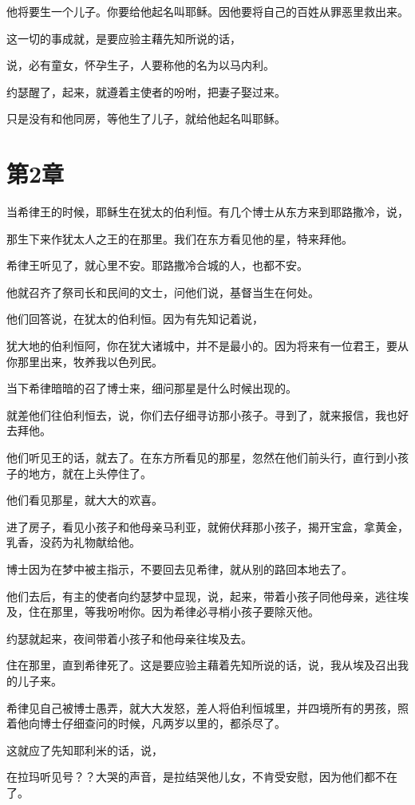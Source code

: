 \documentclass[12pt,oneside]{book}
\begin{document}
他将要生一个儿子。你要给他起名叫耶稣。因他要将自己的百姓从罪恶里救出来。

这一切的事成就，是要应验主藉先知所说的话，

说，必有童女，怀孕生子，人要称他的名为以马内利。

约瑟醒了，起来，就遵着主使者的吩咐，把妻子娶过来。

只是没有和他同房，等他生了儿子，就给他起名叫耶稣。

\chapter{第2章}
当希律王的时候，耶稣生在犹太的伯利恒。有几个博士从东方来到耶路撒冷，说，

那生下来作犹太人之王的在那里。我们在东方看见他的星，特来拜他。

希律王听见了，就心里不安。耶路撒冷合城的人，也都不安。

他就召齐了祭司长和民间的文士，问他们说，基督当生在何处。

他们回答说，在犹太的伯利恒。因为有先知记着说，

犹大地的伯利恒阿，你在犹大诸城中，并不是最小的。因为将来有一位君王，要从你那里出来，牧养我以色列民。

当下希律暗暗的召了博士来，细问那星是什么时候出现的。

就差他们往伯利恒去，说，你们去仔细寻访那小孩子。寻到了，就来报信，我也好去拜他。

他们听见王的话，就去了。在东方所看见的那星，忽然在他们前头行，直行到小孩子的地方，就在上头停住了。

他们看见那星，就大大的欢喜。

进了房子，看见小孩子和他母亲马利亚，就俯伏拜那小孩子，揭开宝盒，拿黄金，乳香，没药为礼物献给他。

博士因为在梦中被主指示，不要回去见希律，就从别的路回本地去了。

他们去后，有主的使者向约瑟梦中显现，说，起来，带着小孩子同他母亲，逃往埃及，住在那里，等我吩咐你。因为希律必寻梢小孩子要除灭他。

约瑟就起来，夜间带着小孩子和他母亲往埃及去。

住在那里，直到希律死了。这是要应验主藉着先知所说的话，说，我从埃及召出我的儿子来。

希律见自己被博士愚弄，就大大发怒，差人将伯利恒城里，并四境所有的男孩，照着他向博士仔细查问的时候，凡两岁以里的，都杀尽了。

这就应了先知耶利米的话，说，

在拉玛听见号？？大哭的声音，是拉结哭他儿女，不肯受安慰，因为他们都不在了。
\end{document}
